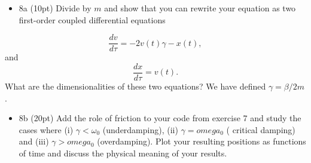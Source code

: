 \documentclass[%
oneside,                 %
final,                   %
10pt]{article}
\begin{document}
\begin{itemize}
\item 8a (10pt) Divide by $m$ and show that you can rewrite your equation as two first-order coupled differential equations
\end{itemize}

\noindent
\[
\frac{dv}{d\tau} = -2v(t)\gamma-x(t),
\]
and
\[
\frac{dx}{d\tau} = v(t).
\]
What are the dimensionalities of these two equations? We have defined $\gamma = \beta/2m$.  


\begin{itemize}
\item 8b (20pt)  Add the role of friction to your code from exercise 7 and study the cases where (i) $\gamma < \omega_0$ (underdamping), (ii) $\gamma = omega_0$ ( critical damping) and (iii) $\gamma > omega_0$ (overdamping). Plot your resulting positions as functions of time and discuss the physical meaning of your results.
\end{itemize}

\noindent


\end{document}
